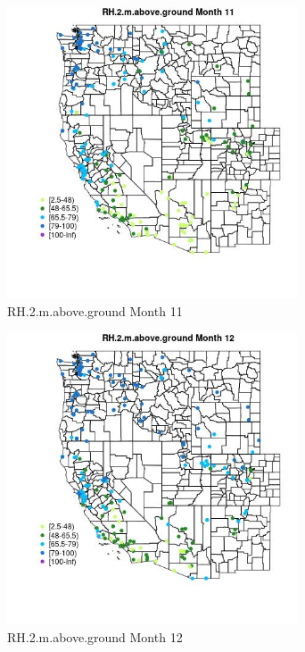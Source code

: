 \begin{figure} 
\centering  
\includegraphics[width=0.77\textwidth]{Code_Outputs/Report_ML_input_PM25_Step4_part_e_de_duplicated_aveswNAs_MapObsMo11RH2maboveground.jpg} 
\caption{\label{fig:Report_ML_input_PM25_Step4_part_e_de_duplicated_aveswNAsMapObsMo11RH2maboveground}RH.2.m.above.ground Month 11} 
\end{figure} 
 

\begin{figure} 
\centering  
\includegraphics[width=0.77\textwidth]{Code_Outputs/Report_ML_input_PM25_Step4_part_e_de_duplicated_aveswNAs_MapObsMo12RH2maboveground.jpg} 
\caption{\label{fig:Report_ML_input_PM25_Step4_part_e_de_duplicated_aveswNAsMapObsMo12RH2maboveground}RH.2.m.above.ground Month 12} 
\end{figure} 
 

